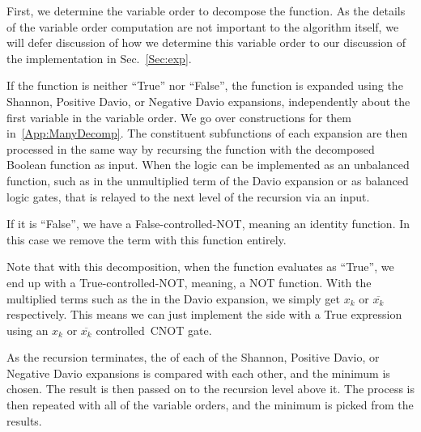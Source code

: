 First, we determine the variable order to decompose the function. As the details of the variable order
computation are not important to the algorithm itself, we will defer discussion of how we determine
this variable order to our discussion of the implementation in Sec.~\ref{Sec:exp}.

If the function is neither ``True'' nor ``False'', the function is expanded using the Shannon, Positive
Davio, or Negative Davio expansions, independently about the first variable in the variable order.
We go over constructions for them in~\ref{App:ManyDecomp}.
The constituent subfunctions of each expansion are then processed in the same way by
recursing the function with the decomposed Boolean function as input. When the logic can be implemented as an
unbalanced function, such as in the unmultiplied term of the Davio expansion or as balanced logic gates, that is
relayed to the next level of the recursion via an input.

If it is ``False'', we have a False-controlled-NOT, meaning an identity function. In this case we remove the term
with this function entirely.

Note that with this decomposition, when the function evaluates as ``True'', we end up with a True-controlled-NOT, meaning, a NOT function. With the multiplied terms such as the  in the Davio expansion, we simply get $x_k$ or $\overline{x_k}$ respectively. This means we can just implement the side with a True expression using an $x_k$ or $\overline{x_k}$ controlled~CNOT gate. 

As the recursion terminates, the  of each of the Shannon, Positive Davio, or Negative Davio expansions is
compared with each other, and the minimum is chosen. The result is then passed on to the recursion level above it.
The process is then repeated with all of the variable orders, and the minimum is picked from the results. 


